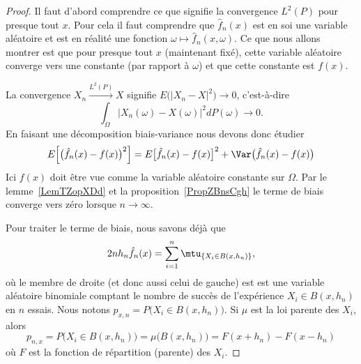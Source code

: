 \begin{proof}
    Il faut d'abord comprendre ce que signifie la convergence \( L^2(P)\) pour presque tout \( x\). Pour cela il faut comprendre que \( \hat f_n(x)\) est en soi une variable aléatoire et est en réalité une fonction \( \omega\mapsto \hat f_n(x,\omega)\). Ce que nous allons montrer est que pour presque tout \( x\) (maintenant fixé), cette variable aléatoire converge vers une constante (par rapport à \( \omega\)) et que cette constante est \( f(x)\).

    La convergence \( X_n\stackrel{L^2(P)}{\to}X\) signifie \( E\big( | X_n-X |^2 \big)\to 0\), c'est-à-dire
    \begin{equation}
        \int_{\Omega}\big| X_n(\omega)-X(\omega) \big|^2dP(\omega)\to 0.
    \end{equation}
    En faisant une décomposition biais-variance nous devons donc étudier
    \begin{equation}
        E\Big[ \big( \hat f_n(x)-f(x) \big)^2 \Big]=E\big[ \hat f_n(x)-f(x) \big]^2+\Var\big( \hat f_n(x)-f(x) \big)
    \end{equation}
    Ici \( f(x)\) doit être vue comme la variable aléatoire constante sur \( \Omega\). Par le lemme~\ref{LemTZopXDd} et la proposition~\ref{PropZBnsCgh} le terme de biais converge vers zéro lorsque \( n\to \infty\).

    Pour traiter le terme de biais, nous savons déjà que
    \begin{equation}
        2nh_n\hat f_n(x)=\sum_{i=1}^n\mtu_{\{ X_i\in B(x,h_n) \}},
    \end{equation}
    où le membre de droite (et donc aussi celui de gauche) est est une variable aléatoire binomiale comptant le nombre de succès de l'expérience \( X_i\in B(x,h_n)\) en \( n\) essais. Nous notons \( p_{x,n}=P\big( X_i\in B(x,h_n) \big)\). Si \( \mu\) est la loi parente des \( X_i\), alors
    \begin{equation}    \label{EqKBKrSHJ}
        p_{n,x}=P\big( X_i\in B(x,h_n) \big)=\mu\big( B(x,h_n) \big)=F(x+h_n)-F(x-h_n)
    \end{equation}
    où \( F\) est la fonction de répartition (parente) des \( X_i\).


\end{proof}
